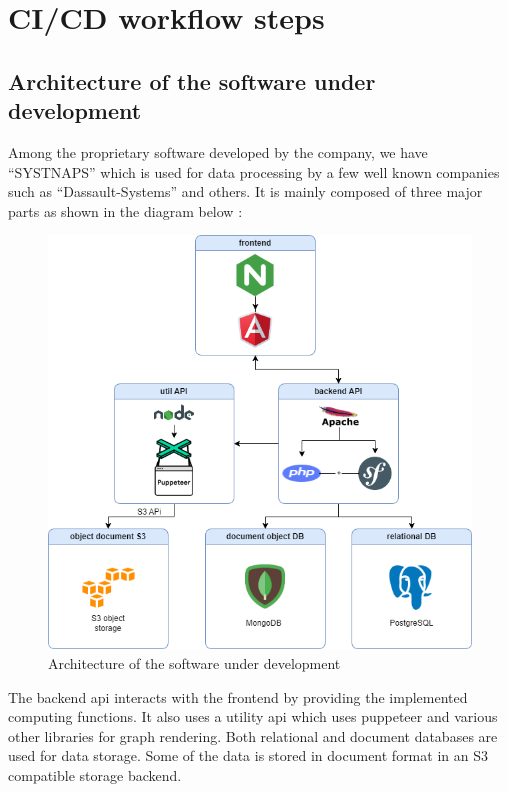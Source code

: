 \section{CI/CD workflow steps }

\subsection{Architecture of the software under development }

Among the proprietary software developed by the company, we have “SYSTNAPS” which is used for data processing by a few well known companies such as “Dassault-Systems” and others. It is mainly composed of three major parts as shown in the diagram below : 

\begin{figure}[H]\centering
\includegraphics[width=1.0\textwidth,angle=00]{assets/f47.png}
\caption{Architecture of the software under development}
\label{fig:Architecture of the software under development}
\end{figure}

The backend api interacts with the frontend by providing the implemented computing functions. It also uses a utility api which uses puppeteer and various other libraries for graph rendering. Both relational and document databases are used for data storage. Some of the data is stored in document format in an S3 compatible storage backend.

